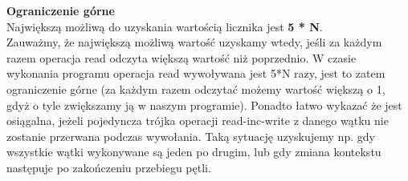 \documentclass{article}
\begin{document}
        \textbf{Ograniczenie górne}\\
        Największą możliwą do uzyskania wartością licznika jest \textbf{5 * N}.\\
        Zauważmy, że największą możliwą wartość uzyskamy wtedy, jeśli za każdym razem operacja read odczyta większą wartość niż poprzednio. W czasie wykonania programu operacja read wywoływana jest 5*N razy, jest to zatem ograniczenie górne (za każdym razem odczytać możemy wartość większą o 1, gdyż o tyle zwiększamy ją w naszym programie). Ponadto łatwo wykazać że jest osiągalna, jeżeli pojedyncza trójka operacji read-inc-write z danego wątku nie zostanie przerwana podczas wywołania. Taką sytuację uzyskujemy np. gdy wszystkie wątki wykonywane są jeden po drugim, lub gdy zmiana kontekstu następuje po zakończeniu przebiegu pętli. 
\end{document}

